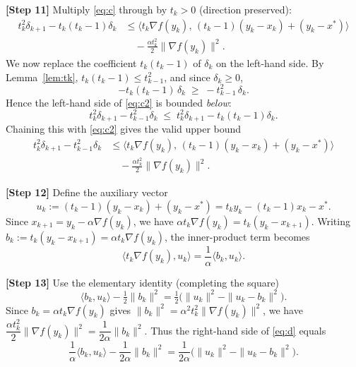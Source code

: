 \documentclass{article}
\begin{document}
\textbf{[Step 11]} Multiply \eqref{eq:c} through by $t_k > 0$ (direction
preserved):
\begin{align}
t_k^2 \delta_{k+1} - t_k(t_k-1)\delta_k
&\le \big\langle t_k\nabla f(y_k),\, (t_k-1)(y_k-x_k) + (y_k - x^*)\big\rangle
\nonumber\\
&\quad - \frac{\alpha t_k^2}{2}\|\nabla f(y_k)\|^2. \label{eq:c2}
\end{align}
We now replace the coefficient $t_k(t_k-1)$ of $\delta_k$ on the left-hand side.
By Lemma~\ref{lem:tk}, $t_k(t_k-1) \le t_{k-1}^2$, and since $\delta_k \ge 0$,
\[
- t_k(t_k-1)\,\delta_k \;\ge\; - t_{k-1}^2\,\delta_k .
\]
Hence the left-hand side of \eqref{eq:c2} is bounded \emph{below}:
\[
t_k^2 \delta_{k+1} - t_{k-1}^2 \delta_k
\;\le\;
t_k^2 \delta_{k+1} - t_k(t_k-1)\delta_k .
\]
Chaining this with \eqref{eq:c2} gives the valid upper bound
\begin{align}
t_k^2 \delta_{k+1} - t_{k-1}^2 \delta_k
&\le \big\langle t_k \nabla f(y_k),\, (t_k-1)(y_k-x_k) + (y_k - x^*)\big\rangle
\nonumber\\
&\quad - \frac{\alpha t_k^2}{2}\|\nabla f(y_k)\|^2. \label{eq:d}
\end{align}

\textbf{[Step 12]} Define the auxiliary vector
\[
u_k := (t_k-1)(y_k - x_k) + (y_k - x^*) = t_k y_k - (t_k-1)x_k - x^*.
\]
Since $x_{k+1} = y_k - \alpha\nabla f(y_k)$, we have
$\alpha t_k \nabla f(y_k) = t_k(y_k - x_{k+1})$. Writing
$b_k := t_k(y_k - x_{k+1}) = \alpha t_k \nabla f(y_k)$, the inner-product term
becomes
\[
\langle t_k \nabla f(y_k), u_k\rangle
= \frac{1}{\alpha}\langle b_k, u_k\rangle.
\]

\textbf{[Step 13]} Use the elementary identity (completing the square)
\begin{equation}
\langle b_k, u_k\rangle - \tfrac12\|b_k\|^2
= \tfrac12\Big(\|u_k\|^2 - \|u_k - b_k\|^2\Big). \label{eq:square}
\end{equation}
Since $b_k = \alpha t_k\nabla f(y_k)$ gives
$\|b_k\|^2 = \alpha^2 t_k^2\|\nabla f(y_k)\|^2$, we have
$\dfrac{\alpha t_k^2}{2}\|\nabla f(y_k)\|^2 = \dfrac{1}{2\alpha}\|b_k\|^2$.
Thus the right-hand side of \eqref{eq:d} equals
\[
\frac{1}{\alpha}\langle b_k, u_k\rangle - \frac{1}{2\alpha}\|b_k\|^2
= \frac{1}{2\alpha}\Big(\|u_k\|^2 - \|u_k - b_k\|^2\Big).
\]
\end{document}
